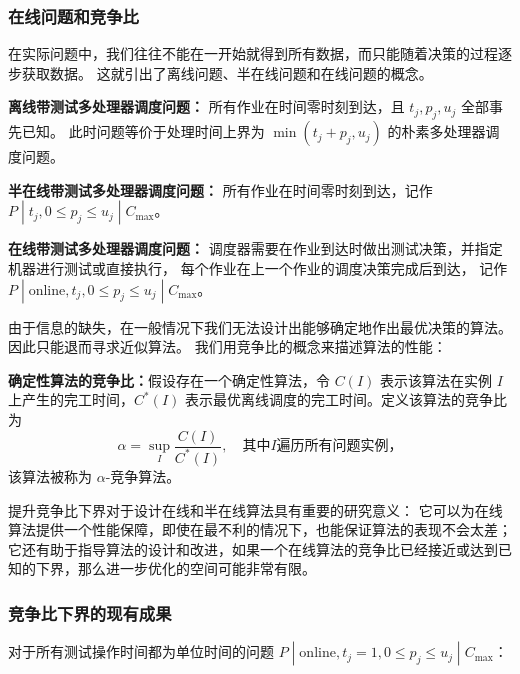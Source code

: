 \subsubsection{在线问题和竞争比}

在实际问题中，我们往往不能在一开始就得到所有数据，而只能随着决策的过程逐步获取数据。
这就引出了离线问题、半在线问题和在线问题的概念。

\begin{defi}
    \textbf{离线带测试多处理器调度问题：}
    所有作业在时间零时刻到达，且 $t_j, p_j, u_j$ 全部事先已知。
    此时问题等价于处理时间上界为 $\min(t_j+p_j,u_j)$ 的朴素多处理器调度问题。
\end{defi}

\begin{defi}
    \textbf{半在线带测试多处理器调度问题：}
    所有作业在时间零时刻到达，记作 $P\;|\;t_j,0\leq p_j\leq u_j\;|\;C_{\text{max}}$。
\end{defi}

\begin{defi}
    \textbf{在线带测试多处理器调度问题：}
    调度器需要在作业到达时做出测试决策，并指定机器进行测试或直接执行，
    每个作业在上一个作业的调度决策完成后到达，
    记作 $P \; | \; \text{online}, t_j, 0\leq p_j \leq u_j \; | \; C_{\text{max}}$。
\end{defi}

由于信息的缺失，在一般情况下我们无法设计出能够确定地作出最优决策的算法。
因此只能退而寻求近似算法。
我们用竞争比的概念来描述算法的性能：

\begin{defi}
    \textbf{确定性算法的竞争比：}假设存在一个确定性算法，令 $C(I)$ 表示该算法在实例 $I$ 上产生的完工时间，$C^*(I)$ 表示最优离线调度的完工时间。定义该算法的竞争比为
    \[
        \alpha=\sup_{I} \frac{C(I)}{C^*(I)}, \quad \text{其中} I \text{遍历所有问题实例，}
    \]
    该算法被称为 $\alpha$-竞争算法。
\end{defi}

提升竞争比下界对于设计在线和半在线算法具有重要的研究意义：
它可以为在线算法提供一个性能保障，即使在最不利的情况下，也能保证算法的表现不会太差；
它还有助于指导算法的设计和改进，如果一个在线算法的竞争比已经接近或达到已知的下界，那么进一步优化的空间可能非常有限。

\subsubsection{竞争比下界的现有成果}

对于所有测试操作时间都为单位时间的问题 $P\;|\;\text{online}, t_j=1,0\leq p_j \leq u_j\;|\; C_{\text{max}}$：

